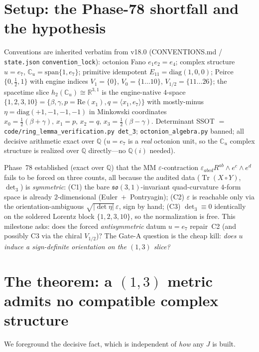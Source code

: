 \documentclass[11pt]{article}
\newcommand{\R}{\mathbb{R}}
\newcommand{\Q}{\mathbb{Q}}
\newcommand{\Cu}{\mathbb{C}_u}
\newcommand{\half}{\tfrac12}
\newcommand{\Tr}{\operatorname{Tr}}
\newcommand{\so}{\mathfrak{so}}
\theoremstyle{plain}\newtheorem{theorem}{Theorem}
\theoremstyle{plain}\newtheorem{proposition}{Proposition}
\theoremstyle{plain}\newtheorem{corollary}{Corollary}
\theoremstyle{definition}\newtheorem{remark}{Remark}
\begin{document}
\section{Setup: the Phase-78 shortfall and the hypothesis}
Conventions are inherited verbatim from v18.0 (CONVENTIONS.md / \texttt{state.json}
\texttt{convention\_lock}): octonion Fano $e_1e_2=e_4$; complex structure $u=e_7$,
$\Cu=\mathrm{span}\{1,e_7\}$; primitive idempotent $E_{11}=\mathrm{diag}(1,0,0)$; Peirce
$\{0,\half,1\}$ with engine indices $V_1=\{0\}$, $V_0=\{1\ldots10\}$,
$V_{1/2}=\{11\ldots26\}$; the spacetime slice $h_2(\Cu)\cong\R^{3,1}$ is the
engine-native $4$-space $\{1,2,3,10\}=\{\beta,\gamma,p=\mathrm{Re}(x_1),q=\langle
x_1,e_7\rangle\}$ with mostly-minus $\eta=\mathrm{diag}(+1,-1,-1,-1)$ in Minkowski
coordinates $x_0=\half(\beta+\gamma),\,x_1=p,\,x_2=q,\,x_3=\half(\beta-\gamma)$. Determinant
SSOT $=$ \texttt{code/ring\_lemma\_verification.py det\_3}; \texttt{octonion\_algebra.py}
banned; all decisive arithmetic exact over $\Q$ ($u=e_7$ is a \emph{real} octonion unit, so
the $\Cu$ complex structure is realized over $\Q$ directly---no $\Q(i)$ needed).

\medskip
Phase~78 established (exact over $\Q$) that the MM $\varepsilon$-contraction
$\varepsilon_{abcd}R^{ab}\wedge e^c\wedge e^d$ fails to be forced on three counts, all
because the audited data ($\Tr(X\circ Y)$, $\det\nolimits_3$) is \emph{symmetric}:
(C1) the bare $\so(3,1)$-invariant quad-curvature $4$-form space is already $2$-dimensional
(Euler~$+$~Pontryagin); (C2) $\varepsilon$ is reachable only via the
orientation-ambiguous $\sqrt{|\det\eta|}\,\varepsilon$, sign by hand; (C3)
$\det\nolimits_3\equiv0$ identically on the soldered Lorentz block $\{1,2,3,10\}$, so the
normalization is free. This milestone asks: does the forced \emph{antisymmetric} datum
$u=e_7$ repair~C2 (and possibly C3 via the chiral $V_{1/2}$)? The Gate-A question is the
cheap kill: \emph{does $u$ induce a sign-definite orientation on the $(1,3)$ slice?}

\section{The theorem: a $(1,3)$ metric admits no compatible complex structure}
We foreground the decisive fact, which is independent of \emph{how} any $J$ is built.
\end{document}
